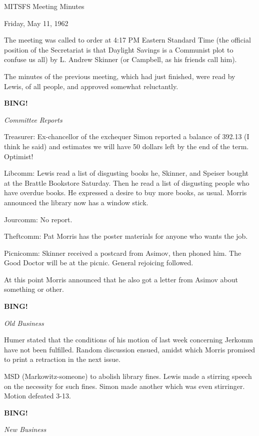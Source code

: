 \documentclass[12pt]{article}
\newcommand{\bing}{{\bf BING!} }
\newcommand{\goto}[1]{\bing \vskip 12pt \centerline{{\em{#1}}}}
\begin{document}
\begin{center}

MITSFS Meeting Minutes

Friday, May 11, 1962

\end{center}
 
\vspace{12pt}

\setlength{\parskip}{6pt}

\noindent
The meeting was called to order at 4:17 PM Eastern Standard Time (the official position of the Secretariat is that Daylight Savings is a Communist plot to confuse us all) by L. Andrew Skinner (or Campbell, as his friends call him).

The minutes of the previous meeting, which had just finished, were read by Lewis, of all people, and approved somewhat reluctantly.

\goto{Committee Reports}

Treasurer: Ex-chancellor of the exchequer Simon reported a balance of 392.13 (I think he said) and estimates we will have 50 dollars left by the end of the term. Optimist!

Libcomm: Lewis read a list of disgusting books he, Skinner, and Speiser bought at the Brattle Bookstore Saturday. Then he read a list of disgusting people who have overdue books. He expressed a desire to buy more books, as usual. Morris announced the library now has a window stick.

Jourcomm: No report.

Theftcomm: Pat Morris has the poster materials for anyone who wants the job.

Picnicomm: Skinner received a postcard from Asimov, then phoned him. The Good Doctor will be at the picnic. General rejoicing followed.

At this point Morris announced that he also got a letter from Asimov about something or other.

\goto{Old Business}

Humer stated that the conditions of his motion of last week concerning Jerkomm have not been fulfilled. Random discussion ensued, amidst which Morris promised to print a retraction in the next issue.

MSD (Markowitz-someone) to abolish library fines. Lewis made a stirring speech on the necessity for such fines. Simon made another which was even stirringer. Motion defeated 3-13.

\goto{New Business}
\end{document}
